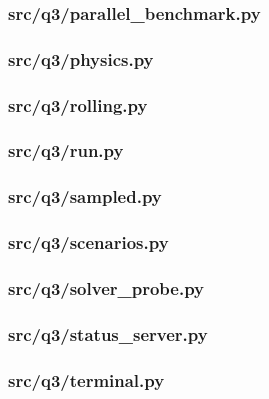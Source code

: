 \documentclass[zihao=-4,a4paper,UTF8,fontset=none]{ctexart}
\begin{document}
\subsubsection*{src/q3/parallel\_benchmark.py}


\subsubsection*{src/q3/physics.py}


\subsubsection*{src/q3/rolling.py}


\subsubsection*{src/q3/run.py}


\subsubsection*{src/q3/sampled.py}


\subsubsection*{src/q3/scenarios.py}


\subsubsection*{src/q3/solver\_probe.py}


\subsubsection*{src/q3/status\_server.py}


\subsubsection*{src/q3/terminal.py}

\end{document}

